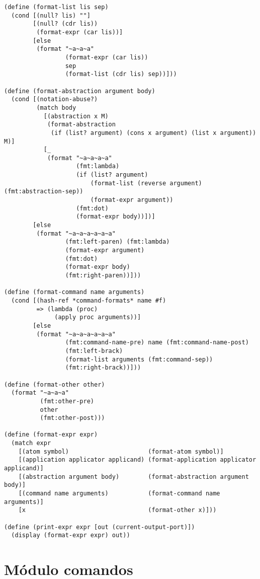 \begin{lstlisting}[language=racket]
(define (format-list lis sep)
  (cond [(null? lis) ""]
        [(null? (cdr lis))
         (format-expr (car lis))]
        [else
         (format "~a~a~a"
                 (format-expr (car lis))
                 sep
                 (format-list (cdr lis) sep))]))

(define (format-abstraction argument body)
  (cond [(notation-abuse?)
         (match body
           [(abstraction x M)
            (format-abstraction
             (if (list? argument) (cons x argument) (list x argument)) M)]
           [_
            (format "~a~a~a~a"
                    (fmt:lambda)
                    (if (list? argument)
                        (format-list (reverse argument) (fmt:abstraction-sep))
                        (format-expr argument))
                    (fmt:dot)
                    (format-expr body))])]
        [else
         (format "~a~a~a~a~a~a"
                 (fmt:left-paren) (fmt:lambda)
                 (format-expr argument)
                 (fmt:dot)
                 (format-expr body)
                 (fmt:right-paren))]))

(define (format-command name arguments)
  (cond [(hash-ref *command-formats* name #f)
         => (lambda (proc)
              (apply proc arguments))]
        [else
         (format "~a~a~a~a~a~a"
                 (fmt:command-name-pre) name (fmt:command-name-post)
                 (fmt:left-brack)
                 (format-list arguments (fmt:command-sep))
                 (fmt:right-brack))]))

(define (format-other other)
  (format "~a~a~a"
          (fmt:other-pre)
          other
          (fmt:other-post)))

(define (format-expr expr)
  (match expr
    [(atom symbol)                      (format-atom symbol)]
    [(application applicator applicand) (format-application applicator applicand)]
    [(abstraction argument body)        (format-abstraction argument body)]
    [(command name arguments)           (format-command name arguments)]
    [x                                  (format-other x)]))

(define (print-expr expr [out (current-output-port)])
  (display (format-expr expr) out))

\end{lstlisting}

\section{Módulo comandos}
\label{ap:2:comandos}

